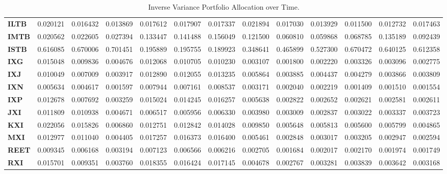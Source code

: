 \begin{table}[h!]
{\begin{tabular}{lrrrrrrrrrrrr}
        \textbf{ILTB} & 0.020121 & 0.016432 & 0.013869 & 0.017612 & 0.017907 & 0.017337 & 0.021894 & 0.017030 & 0.013929 & 0.011500 & 0.012732 & 0.017463 \\
        \textbf{IMTB} & 0.020562 & 0.022605 & 0.027394 & 0.133447 & 0.141488 & 0.156049 & 0.121500 & 0.060810 & 0.059868 & 0.068785 & 0.135189 & 0.092439 \\
        \textbf{ISTB} & 0.616085 & 0.670006 & 0.701451 & 0.195889 & 0.195755 & 0.189923 & 0.348641 & 0.465899 & 0.527300 & 0.670472 & 0.640125 & 0.612358 \\
        \textbf{IXG}  & 0.015048 & 0.009836 & 0.004676 & 0.012068 & 0.010705 & 0.010230 & 0.003107 & 0.001800 & 0.002220 & 0.003326 & 0.003096 & 0.002775 \\
        \textbf{IXJ}  & 0.010049 & 0.007009 & 0.003917 & 0.012890 & 0.012055 & 0.013235 & 0.005864 & 0.003885 & 0.004437 & 0.004279 & 0.003866 & 0.003809 \\
        \textbf{IXN}  & 0.005634 & 0.004617 & 0.001597 & 0.007944 & 0.007161 & 0.008537 & 0.003171 & 0.002040 & 0.002219 & 0.001409 & 0.001510 & 0.001554 \\
        \textbf{IXP}  & 0.012678 & 0.007692 & 0.003259 & 0.015024 & 0.014245 & 0.016257 & 0.005638 & 0.002822 & 0.002652 & 0.002621 & 0.002581 & 0.002611 \\
        \textbf{JXI}  & 0.011809 & 0.010938 & 0.004671 & 0.006517 & 0.005956 & 0.006330 & 0.003980 & 0.003009 & 0.002837 & 0.003022 & 0.003337 & 0.003723 \\
        \textbf{KXI}  & 0.022056 & 0.015826 & 0.006860 & 0.012751 & 0.012842 & 0.014028 & 0.009850 & 0.005648 & 0.005813 & 0.005600 & 0.005799 & 0.004865 \\
        \textbf{MXI}  & 0.012977 & 0.011040 & 0.004405 & 0.017257 & 0.016373 & 0.016400 & 0.005461 & 0.002848 & 0.003017 & 0.003205 & 0.002947 & 0.002594 \\
        \textbf{REET} & 0.009345 & 0.006168 & 0.003194 & 0.007123 & 0.006566 & 0.006216 & 0.002705 & 0.001684 & 0.002017 & 0.002170 & 0.001974 & 0.001749 \\
        \textbf{RXI}  & 0.015701 & 0.009351 & 0.003760 & 0.018355 & 0.016424 & 0.017145 & 0.004678 & 0.002767 & 0.003281 & 0.003839 & 0.003642 & 0.003168
    \end{tabular}}
    \caption{Inverse Variance Portfolio Allocation over Time.}
\end{table}